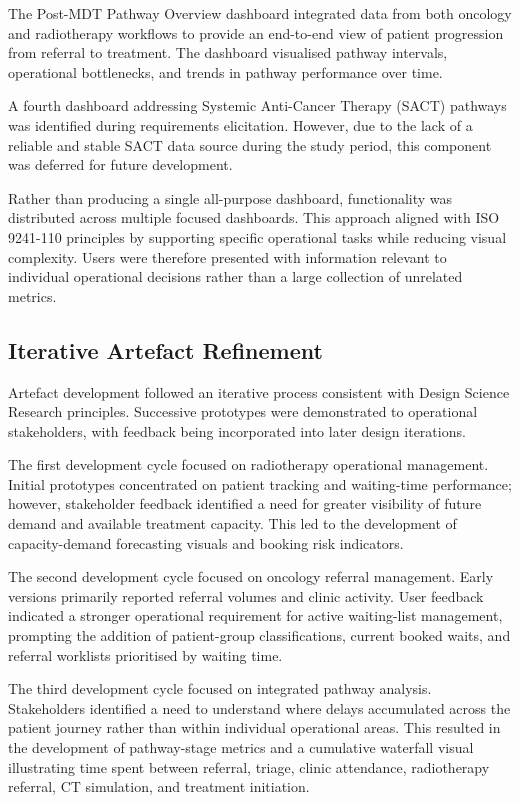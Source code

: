 The Post-MDT Pathway Overview dashboard integrated data from both oncology and radiotherapy workflows to provide an end-to-end view of patient progression from referral to treatment. The dashboard visualised pathway intervals, operational bottlenecks, and trends in pathway performance over time. 

A fourth dashboard addressing Systemic Anti-Cancer Therapy (SACT) pathways was identified during requirements elicitation. However, due to the lack of a reliable and stable SACT data source during the study period, this component was deferred for future development.

Rather than producing a single all-purpose dashboard, functionality was distributed across multiple focused dashboards. This approach aligned with ISO 9241-110 principles by supporting specific operational tasks while reducing visual complexity. Users were therefore presented with information relevant to individual operational decisions rather than a large collection of unrelated metrics.

\subsection{Iterative Artefact Refinement}
Artefact development followed an iterative process consistent with Design Science Research principles. Successive prototypes were demonstrated to operational stakeholders, with feedback being incorporated into later design iterations. 

The first development cycle focused on radiotherapy operational management. Initial prototypes concentrated on patient tracking and waiting-time performance; however, stakeholder feedback identified a need for greater visibility of future demand and available treatment capacity. This led to the development of capacity-demand forecasting visuals and booking risk indicators. 

The second development cycle focused on oncology referral management. Early versions primarily reported referral volumes and clinic activity. User feedback indicated a stronger operational requirement for active waiting-list management, prompting the addition of patient-group classifications, current booked waits, and referral worklists prioritised by waiting time. 

The third development cycle focused on integrated pathway analysis. Stakeholders identified a need to understand where delays accumulated across the patient journey rather than within individual operational areas. This resulted in the development of pathway-stage metrics and a cumulative waterfall visual illustrating time spent between referral, triage, clinic attendance, radiotherapy referral, CT simulation, and treatment initiation. 

